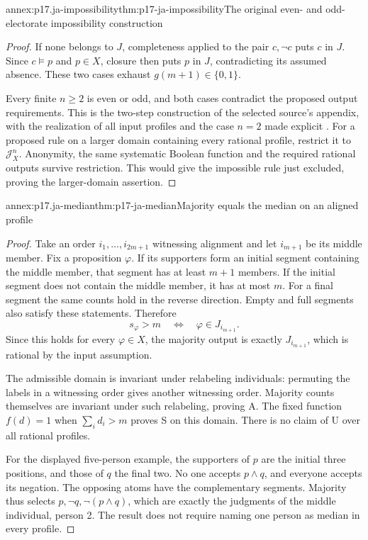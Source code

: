 \begin{annexitem}{annex:p17.ja-impossibility}{thm:p17-ja-impossibility}{The original even- and odd-electorate impossibility construction}
\begin{proof}
If none belongs to \(J\), completeness applied to the pair \(c,\neg c\)
puts \(c\) in \(J\). Since \(c\models p\) and \(p\in X\), closure then
puts \(p\) in \(J\), contradicting its assumed absence. These two cases
exhaust \(g(m+1)\in\{0,1\}\).

Every finite \(n\geq2\) is even or odd, and both cases contradict the proposed
output requirements. This is the two-step construction of the selected source's
appendix, with the realization of all input profiles and the case \(n=2\)
made explicit \cite[pp.~27--29]{ListPettit2001JudgmentPreprint}.
For a proposed rule on a larger domain containing every rational profile,
restrict it to \(\mathcal J_X^n\). Anonymity, the same systematic Boolean
function and the required rational outputs survive restriction. This would
give the impossible rule just excluded, proving the larger-domain assertion.
\end{proof}
\end{annexitem}

\begin{annexitem}{annex:p17.ja-median}{thm:p17-ja-median}{Majority equals the median on an aligned profile}
\begin{proof}
Take an order \(i_1,\ldots,i_{2m+1}\) witnessing alignment and let
\(i_{m+1}\) be its middle member. Fix a proposition \(\varphi\).
If its supporters form an initial segment containing the middle member,
that segment has at least \(m+1\) members. If the initial segment does not
contain the middle member, it has at most \(m\). For a final segment the
same counts hold in the reverse direction. Empty and full segments also
satisfy these statements. Therefore
\[
 s_\varphi>m
 \quad\Longleftrightarrow\quad
 \varphi\in J_{i_{m+1}}.
\]
Since this holds for every \(\varphi\in X\), the majority output is exactly
\(J_{i_{m+1}}\), which is rational by the input assumption.

The admissible domain is invariant under relabeling individuals: permuting
the labels in a witnessing order gives another witnessing order. Majority
counts themselves are invariant under such relabeling, proving A. The fixed
function \(f(d)=1\) when \(\sum_i d_i>m\) proves S on this domain. There is
no claim of U over all rational profiles.

For the displayed five-person example, the supporters of \(p\) are the
initial three positions, and those of \(q\) the final two. No one accepts
\(p\land q\), and everyone accepts its negation. The opposing atoms have
the complementary segments. Majority thus selects \(p,\neg q,\neg(p\land q)\),
which are exactly the judgments of the middle individual, person 2. The result
does not require naming one person as median in every profile.
\end{proof}
\end{annexitem}

